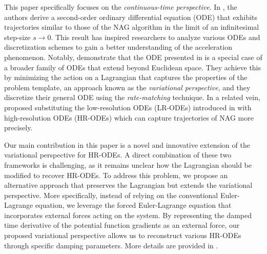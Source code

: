 \documentclass{article}
\theoremstyle{plain}
\theoremstyle{definition}
\theoremstyle{remark}
\begin{document}

This paper specifically focuses on the \textit{continuous-time perspective}. In \citep{JMLR:v17:15-084}, the authors derive a second-order ordinary differential equation (ODE) that exhibits trajectories similar to those of the NAG algorithm in the limit of an infinitesimal step-size $s \to 0$. This result has inspired researchers to analyze various ODEs and discretization schemes to gain a better understanding of the acceleration phenomenon. Notably, \citet{WibisonoE7351} demonstrate that the ODE presented in \citep{JMLR:v17:15-084} is a special case of a broader family of ODEs that extend beyond Euclidean space. They achieve this by minimizing the action on a Lagrangian that captures the properties of the problem template, an approach known as the \textit{variational perspective}, and they discretize their general ODE using the \textit{rate-matching} technique. In a related vein, \citet{Shi2021UnderstandingTA} proposed substituting the low-resolution ODEs (LR-ODEs) introduced in \citep{JMLR:v17:15-084} with high-resolution ODEs (HR-ODEs) which can capture trajectories of NAG more precisely. 

Our main contribution in this paper is a novel and innovative extension of the variational perspective for HR-ODEs. A direct combination of these two frameworks is challenging, as it remains unclear how the Lagrangian should be modified to recover HR-ODEs. To address this problem, we propose an alternative approach that preserves the Lagrangian but extends the variational perspective. More specifically, instead of relying on the conventional Euler-Lagrange equation, we leverage the forced Euler-Lagrange equation that incorporates external forces acting on the system. By representing the damped time derivative of the potential function gradients as an external force, our proposed variational perspective allows us to reconstruct various HR-ODEs through specific damping parameters. More details are provided in .
\end{document}
